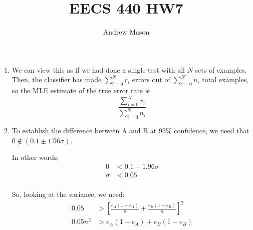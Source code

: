 \documentclass[12pt]{article}
\title{EECS 440 HW7}
\author{Andrew Mason}
\begin{document}
\maketitle

\begin{enumerate}
  \item
    We can view this as if we had done a single test with all $N$ sets of
    examples. Then, the classifier has made $\sum_{i=0}^{N}r_i$ errors out of
    $\sum_{i=0}^Nn_i$ total examples, so the MLE estimate of the true error
    rate is
    \begin{equation}
      \frac{\sum_{i=0}^Nr_i}{\sum_{i=0}^Nn_i}
    \end{equation}
  \item
    To establish the difference between A and B at 95\% confidence, we need
    that $0\notin\left(0.1\pm1.96\sigma\right)$.

    In other words,
    \begin{equation}
      \begin{split}
        0&<0.1-1.96\sigma\\
        \sigma&<0.05\\
      \end{split}
    \end{equation}

    So, looking at the variance, we need:
    \begin{equation}
      \begin{split}
        0.05&>\left[\frac{e_A\left(1-e_A\right)}{n}+\frac{e_B\left(1-e_B\right)}{n}\right]^2\\
        0.05n^2&>e_A\left(1-e_A\right)+e_B\left(1-e_B\right)\\
      \end{split}
    \end{equation}


\end{enumerate}
\end{document}
